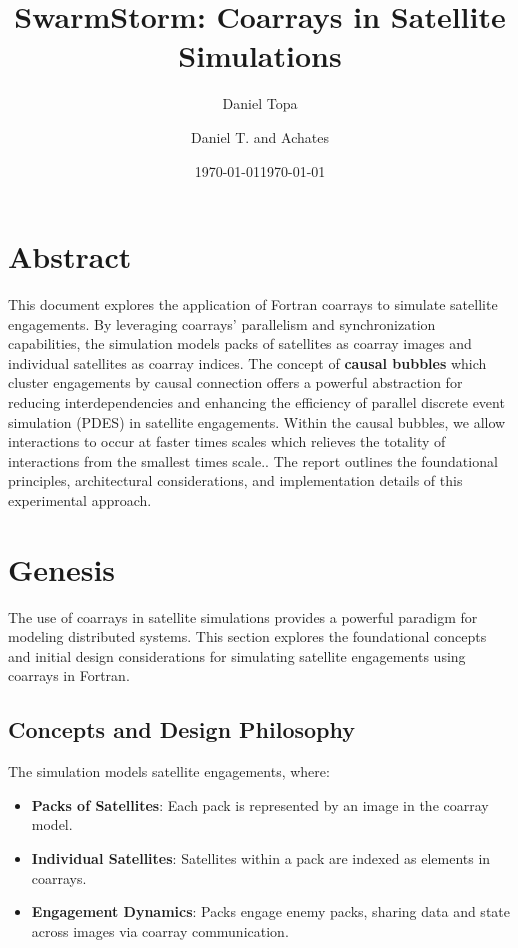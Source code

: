 \documentclass{article}
\title{SwarmStorm: Coarrays in Satellite Simulations}
\author{Daniel Topa\\\TopaHIIEmail}
\affil{\missiontech}
\date{\today}
\author{Daniel T. and Achates}
\date{\today}
\begin{document}
\maketitle

\tableofcontents

\section*{Abstract}
This document explores the application of Fortran coarrays to simulate satellite engagements. By leveraging coarrays' parallelism and synchronization capabilities, the simulation models packs of satellites as coarray images and individual satellites as coarray indices. The concept of \textbf{causal bubbles} which cluster engagements by causal connection offers a powerful abstraction for reducing interdependencies and enhancing the efficiency of parallel discrete event simulation (PDES) in satellite engagements. Within the causal bubbles, we allow interactions to occur at faster times scales which relieves the totality of interactions from the smallest times scale.. The report outlines the foundational principles, architectural considerations, and implementation details of this experimental approach.

\section{Genesis}

The use of coarrays in satellite simulations provides a powerful paradigm for modeling distributed systems. This section explores the foundational concepts and initial design considerations for simulating satellite engagements using coarrays in Fortran.

\subsection{Concepts and Design Philosophy}

The simulation models satellite engagements, where:
\begin{itemize}
    \item \textbf{Packs of Satellites}: Each pack is represented by an image in the coarray model.
    \item \textbf{Individual Satellites}: Satellites within a pack are indexed as elements in coarrays.
    \item \textbf{Engagement Dynamics}: Packs engage enemy packs, sharing data and state across images via coarray communication.
\end{itemize}
\end{document}

